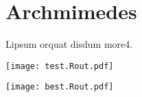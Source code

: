 \documentclass[12pt]{article}
\begin{document}
\section{Archmimedes}

Lipsum orquat disdum more4.

\texttt{[image: test.Rout.pdf]}

\texttt{[image: best.Rout.pdf]}
\end{document}
